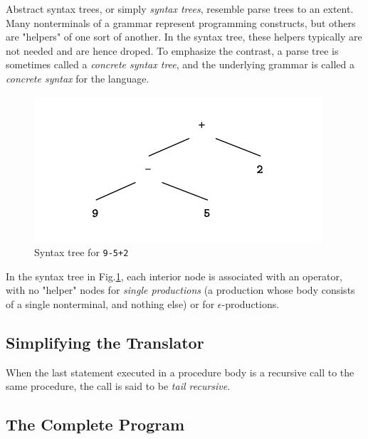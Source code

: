 \documentclass[a4paper,twoside]{book}
\begin{document}
Abstract syntax trees, or simply \textit{syntax trees}, resemble parse trees to an extent. Many nonterminals of a grammar represent programming constructs, but others are "helpers" of one sort of another. In the syntax tree, these helpers typically are not needed and are hence droped. To emphasize the contrast, a parse tree is sometimes called a \textit{concrete syntax tree}, and the underlying grammar is called a \textit{concrete syntax} for the language.

\begin{figure}[htbp]
    \centering
    \includegraphics[width=\linewidth]{Figure2 22.pdf}
    \caption{Syntax tree for \texttt{9-5+2}}
    \label{Figure:2.22}
\end{figure}

In the syntax tree in Fig.\;\ref{Figure:2.22}, each interior node is associated with an operator, with no "helper" nodes for \textit{single productions} (a production whose body consists of a single nonterminal, and nothing else) or for $\epsilon$-productions.

\subsection{Simplifying the Translator}

When the last statement executed in a procedure body is a recursive call to the same procedure, the call is said to be \textit{tail recursive}.

\subsection{The Complete Program}
\end{document}

